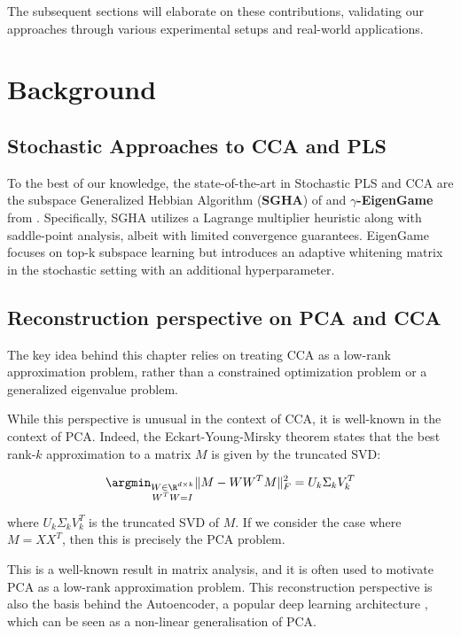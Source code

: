 The subsequent sections will elaborate on these contributions, validating our approaches through various experimental setups and real-world applications.


\section{Background}
\subsection{Stochastic Approaches to CCA and PLS}

To the best of our knowledge, the state-of-the-art in Stochastic PLS and CCA are the subspace Generalized Hebbian Algorithm (\textbf{SGHA}) of \cite{chen2019constrained} and \textbf{$\gamma$-EigenGame} from \cite{gemp20,gemp2021}. Specifically, SGHA utilizes a Lagrange multiplier heuristic along with saddle-point analysis, albeit with limited convergence guarantees. EigenGame focuses on top-k subspace learning but introduces an adaptive whitening matrix in the stochastic setting with an additional hyperparameter.

\subsection{Reconstruction perspective on PCA and CCA}
The key idea behind this chapter relies on treating CCA as a low-rank approximation problem, rather than a constrained optimization problem or a generalized eigenvalue problem.

While this perspective is unusual in the context of CCA, it is well-known in the context of PCA. Indeed, the Eckart-Young-Mirsky theorem \cite{stewart_matrix_1990} states that the best rank-$k$ approximation to a matrix $M$ is given by the truncated SVD:

\begin{align}
    \argmin_{\substack{W \in \R^{d \times k} \\ W^T W = I}} \| M - W W^T M \|_F^2 = U_k \Sigma_k V_k^T
\end{align}

where $U_k \Sigma_k V_k^T$ is the truncated SVD of $M$. If we consider the case where $M=XX^T$, then this is precisely the PCA problem. 

This is a well-known result in matrix analysis, and it is often used to motivate PCA as a low-rank approximation problem. 
This reconstruction perspective is also the basis behind the Autoencoder, a popular deep learning architecture \cite{goodfellow2016deep}, which can be seen as a non-linear generalisation of PCA. 

